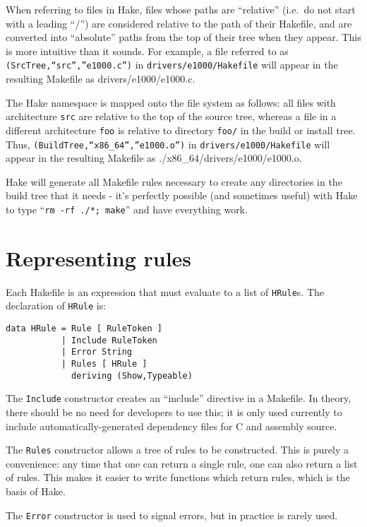 \documentclass[a4paper,twoside]{report} %
\begin{document}
When referring to files in Hake, files whose paths are ``relative''
(i.e.\ do not start with a leading ``/'') are considered relative to
the path of their Hakefile, and are converted into
``absolute'' paths from the top of their tree when they appear.
This is more intuitive than it sounds.  For example, a file referred
to as \texttt{(SrcTree,``src'',''e1000.c'')} in
\texttt{drivers/e1000/Hakefile} will appear in the resulting Makefile
as {drivers/e1000/e1000.c}.  

The Hake namespace is mapped onto the file system as follows: all
files with architecture \texttt{src} are relative to the top of the
source tree, whereas a file in a different architecture \texttt{foo}
is relative to directory \texttt{foo/} in the build or install tree.
Thus, \texttt{(BuildTree,``x86\_64'',''e1000.o'')} in
\texttt{drivers/e1000/Hakefile} will  appear in the resulting Makefile
as {./x86\_64/drivers/e1000/e1000.o}. 

Hake will generate all Makefile rules necessary to create any
directories in the build tree that it needs - it's perfectly possible
(and sometimes useful) with Hake to type ``\texttt{rm -rf ./*;
  make}'' and have everything work.  

\section{Representing rules}\label{sec:reprules}

Each Hakefile is an expression that must evaluate to a list of
\texttt{HRule}s.  The declaration of \texttt{HRule} is:
\begin{verbatim}
data HRule = Rule [ RuleToken ]
           | Include RuleToken
           | Error String
           | Rules [ HRule ]
             deriving (Show,Typeable)
\end{verbatim}

The \texttt{Include} constructor creates an ``include'' directive in a
Makefile.  In theory, there should be no need for developers to use
this; it is only used currently to include automatically-generated
dependency files for C and assembly source. 

The \texttt{Rules} constructor allows a tree of rules to be
constructed.  This is purely a convenience: any time that one can
return a single rule, one can also return a list of rules.  This makes
it easier to write functions which return rules, which is the basis of
Hake.

The \texttt{Error} constructor is used to signal errors, but in
practice is rarely used. 
\end{document}
